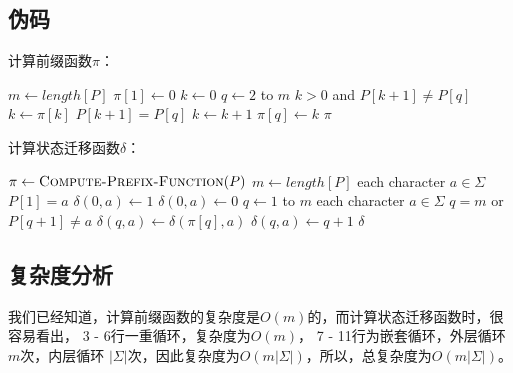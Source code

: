 \documentclass{article}
\begin{document}
\begin{CJK}{UTF8}{gbsn}
\subsection*{伪码}

计算前缀函数$\pi$：

\begin{codebox}
\li $m \gets length[P]$
\li $\pi[1] \gets 0$
\li $k \gets 0$
\li \For $q \gets 2$ to $m$
\li		\Do \While $k > 0 $ and $P[k+1] \neq P[q]$
\li				\Do $k \gets \pi[k]$
				\End
\li			\If $P[k+1] = P[q]$
\li				\Then $k \gets k+1$
				\End
\li			$\pi[q] \gets k$
		\End
\li \Return $\pi$		
\end{codebox}

计算状态迁移函数$\delta$：

\begin{codebox}
\li $\pi \gets \textnormal{\scshape Compute-Prefix-Function}(P)$
\li $m \gets length[P]$
\li \For each character $a \in \Sigma$
\li 	\Do \If $P[1] = a$
\li				\Then $\delta(0,a) \gets 1$
\li				\Else $\delta(0,a) \gets 0$
				\End
		\End
\li \For $q \gets 1$ to $m$
\li		\Do \For each character $a \in \Sigma$
\li				\Do \If $q = m$ or $P[q+1] \neq a$
\li						\Then $\delta(q,a) \gets \delta(\pi[q],a)$
\li						\Else $\delta(q,a) \gets q+1$
						\End
				\End
		\End
\li \Return $\delta$
\end{codebox}

\subsection*{复杂度分析}

我们已经知道，计算前缀函数的复杂度是$O(m)$的，而计算状态迁移函数时，很容易看出，
3 - 6行一重循环，复杂度为$O(m)$， 7 - 11行为嵌套循环，外层循环$m$次，内层循环
$|\Sigma|$次，因此复杂度为$O(m|\Sigma|)$，所以，总复杂度为$O(m|\Sigma|)$。


\end{CJK}
\end{document}
